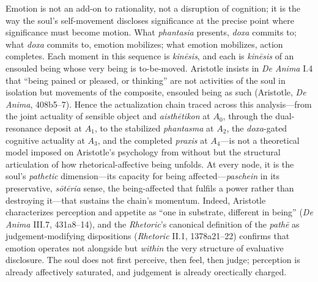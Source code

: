 \documentclass{article}
\begin{document}
Emotion is not an add-on to rationality, not a disruption of cognition; it is the way the soul's self-movement discloses significance at the precise point where significance must become motion. What \textit{phantasia} presents, \textit{doxa} commits to; what \textit{doxa} commits to, emotion mobilizes; what emotion mobilizes, action completes. Each moment in this sequence is \textit{kinēsis}, and each is \textit{kinēsis} of an ensouled being whose very being is to-be-moved. Aristotle insists in \textit{De Anima} I.4 that ``being pained or pleased, or thinking'' are not activities of the soul in isolation but movements of the composite, ensouled being as such (Aristotle, \textit{De Anima}, 408b5--7). Hence the actualization chain traced across this analysis---from the joint actuality of sensible object and \textit{aisthētikon} at $A_0$, through the dual-resonance deposit at $A_1$, to the stabilized \textit{phantasma} at $A_2$, the \textit{doxa}-gated cognitive actuality at $A_3$, and the completed \textit{praxis} at $A_4$---is not a theoretical model imposed on Aristotle's psychology from without but the structural articulation of how rhetorical-affective being unfolds. At every node, it is the soul's \textit{pathetic} dimension---its capacity for being affected---\textit{paschein} in its preservative, \textit{sōtēria} sense, the being-affected that fulfils a power rather than destroying it---that sustains the chain's momentum. Indeed, Aristotle characterizes perception and appetite as ``one in substrate, different in being'' (\textit{De Anima} III.7, 431a8--14), and the \textit{Rhetoric}'s canonical definition of the \textit{pathē} as judgement-modifying dispositions (\textit{Rhetoric} II.1, 1378a21--22) confirms that emotion operates not alongside but \textit{within} the very structure of evaluative disclosure. The soul does not first perceive, then feel, then judge; perception is already affectively saturated, and judgement is already orectically charged.
\end{document}
